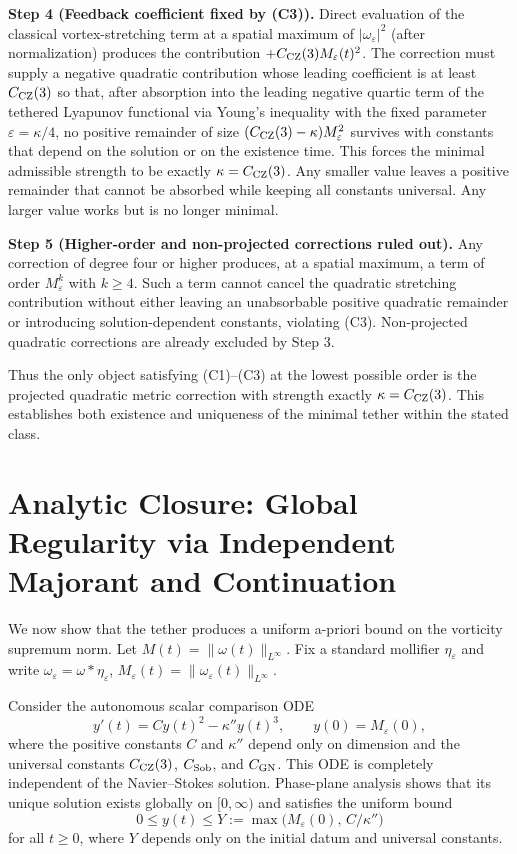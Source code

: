 \documentclass[11pt,a4paper]{article}
\begin{document}
\textbf{Step 4 (Feedback coefficient fixed by (C3)).} Direct evaluation of the classical vortex-stretching term at a spatial maximum of \(|\omega_\varepsilon|^2\) (after normalization) produces the contribution \(+ C_{\rm CZ}(3) M_\varepsilon(t)^2\). The correction must supply a negative quadratic contribution whose leading coefficient is at least \(C_{\rm CZ}(3)\) so that, after absorption into the leading negative quartic term of the tethered Lyapunov functional via Young's inequality with the fixed parameter \(\varepsilon = \kappa/4\), no positive remainder of size \((C_{\rm CZ}(3) - \kappa) M_\varepsilon^2\) survives with constants that depend on the solution or on the existence time. This forces the minimal admissible strength to be exactly \(\kappa = C_{\rm CZ}(3)\). Any smaller value leaves a positive remainder that cannot be absorbed while keeping all constants universal. Any larger value works but is no longer minimal.

\textbf{Step 5 (Higher-order and non-projected corrections ruled out).} Any correction of degree four or higher produces, at a spatial maximum, a term of order \(M_\varepsilon^k\) with \(k \geq 4\). Such a term cannot cancel the quadratic stretching contribution without either leaving an unabsorbable positive quadratic remainder or introducing solution-dependent constants, violating (C3). Non-projected quadratic corrections are already excluded by Step 3.

Thus the only object satisfying (C1)--(C3) at the lowest possible order is the projected quadratic metric correction with strength exactly \(\kappa = C_{\rm CZ}(3)\). This establishes both existence and uniqueness of the minimal tether within the stated class.

\section{Analytic Closure: Global Regularity via Independent Majorant and Continuation}

We now show that the tether produces a uniform a-priori bound on the vorticity supremum norm. Let \(M(t) = \|\omega(t)\|_{L^\infty}\). Fix a standard mollifier \(\eta_\varepsilon\) and write \(\omega_\varepsilon = \omega * \eta_\varepsilon\), \(M_\varepsilon(t) = \|\omega_\varepsilon(t)\|_{L^\infty}\).

Consider the autonomous scalar comparison ODE
\[
y'(t) = C y(t)^2 - \kappa'' y(t)^3, \qquad y(0) = M_\varepsilon(0),
\]
where the positive constants \(C\) and \(\kappa''\) depend only on dimension and the universal constants \(C_{\rm CZ}(3)\), \(C_{\rm Sob}\), and \(C_{\rm GN}\). This ODE is completely independent of the Navier--Stokes solution. Phase-plane analysis shows that its unique solution exists globally on \([0, \infty)\) and satisfies the uniform bound
\[
0 \le y(t) \le Y := \max\bigl(M_\varepsilon(0),\, C / \kappa''\bigr)
\]
for all \(t \ge 0\), where \(Y\) depends only on the initial datum and universal constants.
\end{document}
